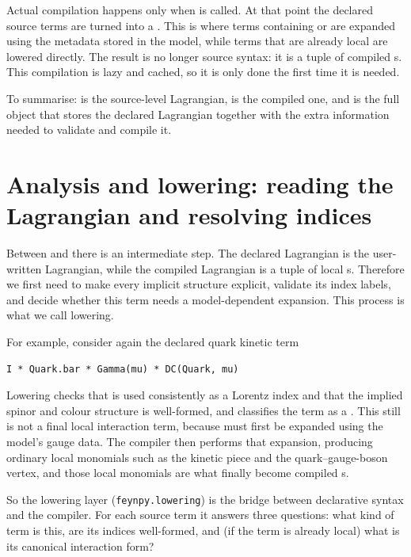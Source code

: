 Actual compilation happens only when  is called. At that point the declared source terms are turned into a . This is where terms containing  or  are expanded using the metadata stored in the model, while terms that are already local are lowered directly. The result is no longer source syntax: it is a tuple of compiled s. This compilation is lazy and cached, so it is only done the first time it is needed.

To summarise:  is the source-level Lagrangian,  is the compiled one, and  is the full object that stores the declared Lagrangian together with the extra information needed to validate and compile it.

\section{Analysis and lowering: reading the Lagrangian and resolving indices}
\label{sec:internals-lowering}

Between  and  there is an intermediate step. The declared Lagrangian is the user-written Lagrangian, while the compiled Lagrangian is a tuple of local s. Therefore we first need to make every implicit structure explicit, validate its index labels, and decide whether this term needs a model-dependent expansion. This process is what we call lowering.

For example, consider again the declared quark kinetic term
\begin{verbatim}
I * Quark.bar * Gamma(mu) * DC(Quark, mu)
\end{verbatim}
Lowering checks that  is used consistently as a Lorentz index and that the implied spinor and colour structure is well-formed, and classifies the term as a . This still is not a final local interaction term, because  must first be expanded using the model's gauge data. The compiler then performs that expansion, producing ordinary local monomials such as the kinetic piece and the quark--gauge-boson vertex, and those local monomials are what finally become compiled s. 

So the lowering layer (\texttt{feynpy.lowering}) is the bridge between declarative syntax and the compiler. For each source term it answers three questions: what kind of term is this, are its indices well-formed, and (if the term is already local) what is its canonical interaction form?

